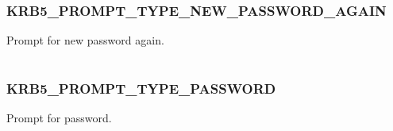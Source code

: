 \documentclass[letterpaper,10pt,english]{sphinxmanual}
\begin{document}
\subsubsection{KRB5\_PROMPT\_TYPE\_NEW\_PASSWORD\_AGAIN}
\label{appdev/refs/macros/KRB5_PROMPT_TYPE_NEW_PASSWORD_AGAIN:krb5-prompt-type-new-password-again}\label{appdev/refs/macros/KRB5_PROMPT_TYPE_NEW_PASSWORD_AGAIN:krb5-prompt-type-new-password-again-data}\label{appdev/refs/macros/KRB5_PROMPT_TYPE_NEW_PASSWORD_AGAIN::doc}

\begin{fulllineitems}
\label{appdev/refs/macros/KRB5_PROMPT_TYPE_NEW_PASSWORD_AGAIN:KRB5_PROMPT_TYPE_NEW_PASSWORD_AGAIN}
\end{fulllineitems}


Prompt for new password again.

\begin{tabulary}{\linewidth}{|L|L|}
\hline

 & 
\\\hline
\end{tabulary}



\subsubsection{KRB5\_PROMPT\_TYPE\_PASSWORD}
\label{appdev/refs/macros/KRB5_PROMPT_TYPE_PASSWORD:krb5-prompt-type-password-data}\label{appdev/refs/macros/KRB5_PROMPT_TYPE_PASSWORD::doc}\label{appdev/refs/macros/KRB5_PROMPT_TYPE_PASSWORD:krb5-prompt-type-password}

\begin{fulllineitems}
\label{appdev/refs/macros/KRB5_PROMPT_TYPE_PASSWORD:KRB5_PROMPT_TYPE_PASSWORD}
\end{fulllineitems}


Prompt for password.

\begin{tabulary}{\linewidth}{|L|L|}
\hline

 & 
\\\hline
\end{tabulary}
\end{document}
